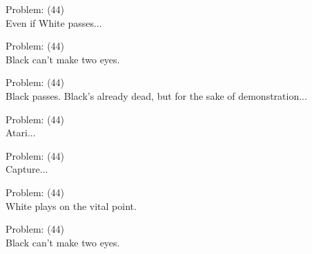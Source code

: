 \documentclass[11pt]{article}
\begin{document}
\begin{minipage}[t]{0.5\textwidth}
  {\centering
  
Problem: (44)\\
Even if White passes...\\
  }
\end{minipage}
\begin{minipage}[t]{0.5\textwidth}
  {\centering
  
Problem: (44)\\
Black can't make two eyes.\\
  }
\end{minipage}
\begin{minipage}[t]{0.5\textwidth}
  {\centering
  
Problem: (44)\\
Black passes. Black's already dead, but for the sake of demonstration...\\
  }
\end{minipage}
\begin{minipage}[t]{0.5\textwidth}
  {\centering
  
Problem: (44)\\
Atari...\\
  }
\end{minipage}
\begin{minipage}[t]{0.5\textwidth}
  {\centering
  
Problem: (44)\\
Capture...\\
  }
\end{minipage}
\begin{minipage}[t]{0.5\textwidth}
  {\centering
  
Problem: (44)\\
White plays on the vital point.\\
  }
\end{minipage}
\begin{minipage}[t]{0.5\textwidth}
  {\centering
  
Problem: (44)\\
Black can't make two eyes.\\
  }
\end{minipage}
\end{document}
